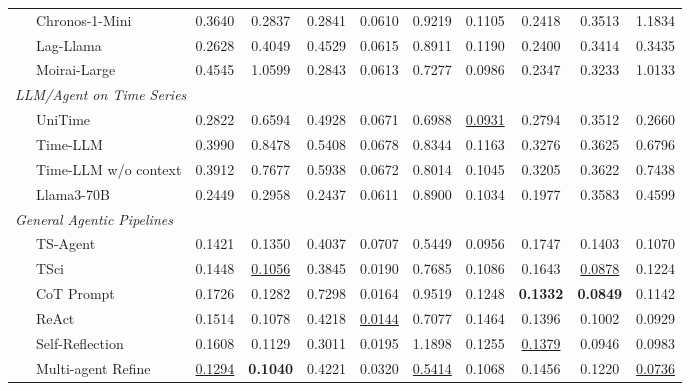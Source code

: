 \begin{table}[t]
{\begin{tabular}{lccccccccc}
~~~Chronos-1-Mini \citeyearpar{DBLP:journals/tmlr/AnsariSTZMSSRPK24} & 0.3640 & 0.2837 & 0.2841 & 0.0610 & 0.9219 & 0.1105 & 0.2418 & 0.3513 & 1.1834 \\
~~~Lag-Llama \citeyearpar{rasul2023lag} & 0.2628 & 0.4049 & 0.4529 & 0.0615 & 0.8911 & 0.1190 & 0.2400 & 0.3414 & 0.3435 \\
~~~Moirai-Large \citeyearpar{DBLP:conf/icml/WooLKXSS24} & 0.4545 & 1.0599 & 0.2843 & 0.0613 & 0.7277 & 0.0986 & 0.2347 & 0.3233 & 1.0133 \\
\midrule
\multicolumn{10}{l}{\textit{LLM/Agent on Time Series}} \\
~~~UniTime \citeyearpar{DBLP:conf/www/LiuHLDLHZ24} & 0.2822 & 0.6594 & 0.4928 & 0.0671 & 0.6988 & \underline{0.0931} & 0.2794 & 0.3512 & 0.2660 \\
~~~Time-LLM \citeyearpar{DBLP:conf/iclr/0005WMCZSCLLPW24} & 0.3990 & 0.8478 & 0.5408 & 0.0678 & 0.8344 & 0.1163 & 0.3276 & 0.3625 & 0.6796 \\
~~~Time-LLM w/o context \citeyearpar{DBLP:conf/iclr/0005WMCZSCLLPW24} & 0.3912 & 0.7677 & 0.5938 & 0.0672 & 0.8014 & 0.1045 & 0.3205 & 0.3622 & 0.7438 \\
~~~Llama3-70B \citeyearpar{DBLP:journals/corr/abs-2407-21783} & 0.2449 & 0.2958 & 0.2437 & 0.0611 & 0.8900 & 0.1034 & 0.1977 & 0.3583 & 0.4599 \\
\midrule
\multicolumn{10}{l}{\textit{General Agentic Pipelines}} \\
~~~TS-Agent \citeyearpar{DBLP:journals/corr/abs-2510-07432}            & 0.1421 & 0.1350 & 0.4037 & 0.0707 & 0.5449 & 0.0956 & 0.1747 & 0.1403 & 0.1070 \\
~~~TSci \citeyearpar{DBLP:journals/corr/abs-2510-01538}                & 0.1448 & \underline{0.1056} & 0.3845 & 0.0190 & 0.7685 & 0.1086 & 0.1643 & \underline{0.0878} & 0.1224 \\
~~~CoT Prompt \citeyearpar{DBLP:conf/nips/Wei0SBIXCLZ22}          & 0.1726 & 0.1282 & 0.7298 & 0.0164 & 0.9519 & 0.1248 & \textbf{0.1332} & \textbf{0.0849} & 0.1142 \\
~~~ReAct \citeyearpar{DBLP:conf/iclr/YaoZYDSN023}               & 0.1514 & 0.1078 & 0.4218 & \underline{0.0144} & 0.7077 & 0.1464 & 0.1396 & 0.1002 & 0.0929 \\
~~~Self-Reflection \citeyearpar{DBLP:journals/corr/abs-2405-06682}     & 0.1608 & 0.1129 & 0.3011 & 0.0195 & 1.1898 & 0.1255 & \underline{0.1379} & 0.0946 & 0.0983 \\
~~~Multi-agent Refine \citeyearpar{DBLP:conf/icml/YuanX25}  & \underline{0.1294} & \textbf{0.1040} & 0.4221 & 0.0320 & \underline{0.5414} & 0.1068 & 0.1456 & 0.1220 & \underline{0.0736} \\


\end{tabular}}
\end{table}
